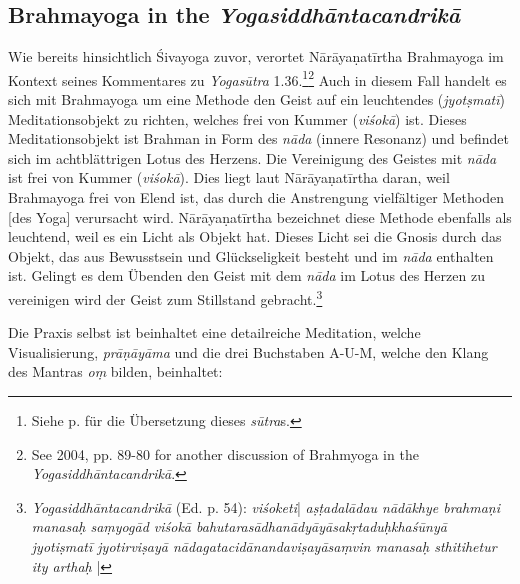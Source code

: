 \subsection{Brahmayoga in the \textit{Yogasiddhāntacandrikā}}

Wie bereits hinsichtlich Śivayoga zuvor, verortet Nārāyaṇatīrtha Brahmayoga im Kontext seines Kommentares zu \textit{Yogasūtra} 1.36.\footnote{Siehe p. \pageref{sivayogacandri} für die Übersetzung dieses \textit{sūtra}s.}\footnote{See \citeauthor{penna2004} 2004, pp. 89-80 for another discussion of Brahmyoga in the \textit{Yogasiddhāntacandrikā}.} Auch in diesem Fall handelt es sich mit Brahmayoga um eine Methode den Geist auf ein leuchtendes (\textit{jyotṣmatī}) Meditationsobjekt zu richten, welches frei von Kummer (\textit{viśokā}) ist. Dieses Meditationsobjekt ist Brahman in Form des \textit{nāda} (innere Resonanz) und befindet sich im achtblättrigen Lotus des Herzens. Die Vereinigung des Geistes mit \textit{nāda} ist frei von Kummer (\textit{viśokā}). Dies liegt laut Nārāyaṇatīrtha daran, weil Brahmayoga frei von Elend ist, das durch die Anstrengung vielfältiger Methoden [des Yoga] verursacht wird. Nārāyaṇatīrtha bezeichnet diese Methode ebenfalls als leuchtend, weil es ein Licht als Objekt hat. Dieses Licht sei die Gnosis durch das Objekt, das aus Bewusstsein und Glückseligkeit besteht und im \textit{nāda} enthalten ist. Gelingt es dem Übenden den Geist mit dem \textit{nāda} im Lotus des Herzen zu vereinigen wird der Geist zum Stillstand gebracht.\footnote{\textit{Yogasiddhāntacandrikā} (Ed. p. 54): \textit{viśoketi}| \textit{aṣṭadalādau nādākhye brahmaṇi manasaḥ saṃyogād viśokā bahutarasādhanādyāyāsakṛtaduḥkhaśūnyā jyotiṣmatī jyotirviṣayā nādagatacidānandaviṣayāsaṃvin manasaḥ sthitihetur ity arthaḥ} |} 

Die Praxis selbst ist beinhaltet eine detailreiche Meditation, welche Visualisierung, \textit{prāṇāyāma} und die drei Buchstaben A-U-M, welche den Klang des Mantras \textit{oṃ} bilden, beinhaltet:


